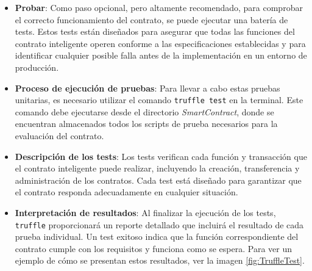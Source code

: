 \begin{itemize}

\item \textbf{Probar}: Como paso opcional, pero altamente recomendado, para comprobar el correcto funcionamiento del contrato, se puede ejecutar una batería de tests. Estos tests están diseñados para asegurar que todas las funciones del contrato inteligente operen conforme a las especificaciones establecidas y para identificar cualquier posible falla antes de la implementación en un entorno de producción.
	
\item \textbf{Proceso de ejecución de pruebas}: Para llevar a cabo estas pruebas unitarias, es necesario utilizar el comando \texttt{truffle test} en la terminal. Este comando debe ejecutarse desde el directorio \textit{SmartContract}, donde se encuentran almacenados todos los scripts de prueba necesarios para la evaluación del contrato.

\item \textbf{Descripción de los tests}: 
Los tests verifican cada función y transacción que el
contrato inteligente puede realizar, incluyendo la creación,
transferencia y administración de los contratos.
Cada test está diseñado para garantizar que el contrato responda adecuadamente en cualquier situación.

\item \textbf{Interpretación de resultados}: Al finalizar la ejecución de los tests, \texttt{truffle} proporcionará un reporte detallado que incluirá el resultado de cada prueba individual.
Un test exitoso indica que la función correspondiente del contrato cumple con los requisitos y funciona como se espera. 
Para ver un ejemplo de cómo se presentan estos resultados, ver la imagen \ref{fig:TruffleTest}.

\end{itemize}


